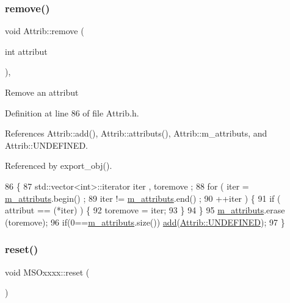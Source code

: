 \subsubsection{\texorpdfstring{remove()}{remove()}}
{\footnotesize\ttfamily void Attrib\+::remove (\begin{DoxyParamCaption}\item[{int}]{attribut }\end{DoxyParamCaption})\hspace{0.3cm}{\ttfamily [inline]}, {\ttfamily [inherited]}}

Remove an attribut 

Definition at line 86 of file Attrib.\+h.



References Attrib\+::add(), Attrib\+::attributs(), Attrib\+::m\+\_\+attributs, and Attrib\+::\+U\+N\+D\+E\+F\+I\+N\+ED.



Referenced by export\+\_\+obj().


\begin{DoxyCode}
86                                \{
87     std::vector<int>::iterator iter , toremove ;
88     \textcolor{keywordflow}{for} ( iter  = \hyperlink{classAttrib_ac4bd58a0cc6b38a3b711d609a3d3aacc}{m\_attributs}.begin() ;
89           iter != \hyperlink{classAttrib_ac4bd58a0cc6b38a3b711d609a3d3aacc}{m\_attributs}.end()   ;
90           ++iter ) \{
91       \textcolor{keywordflow}{if} ( attribut == (*iter) ) \{
92         toremove = iter;
93       \}
94     \}
95     \hyperlink{classAttrib_ac4bd58a0cc6b38a3b711d609a3d3aacc}{m\_attributs}.erase (toremove);
96     \textcolor{keywordflow}{if}(0==\hyperlink{classAttrib_ac4bd58a0cc6b38a3b711d609a3d3aacc}{m\_attributs}.size()) \hyperlink{classAttrib_a235f773af19c900264a190b00a3b4ad7}{add}(\hyperlink{classAttrib_a69e171d7cc6417835a5a306d3c764235a3a8da2ab97dda18aebab196fe4100531}{Attrib::UNDEFINED});
97   \}
\end{DoxyCode}
\mbox{\label{classMSOxxxx_a26f03d21da556529155898dc115c301c}} 
\subsubsection{\texorpdfstring{reset()}{reset()}}
{\footnotesize\ttfamily void M\+S\+Oxxxx\+::reset (\begin{DoxyParamCaption}{ }\end{DoxyParamCaption})\hspace{0.3cm}{\ttfamily [virtual]}}

